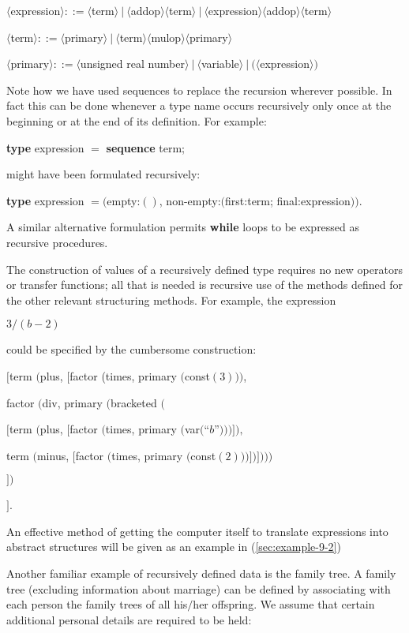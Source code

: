 \quad $\langle$expression$\rangle ::= \langle$term$\rangle\ |\ \langle$addop$\rangle \langle$term$\rangle\ |\ \langle$expression$\rangle \langle$addop$\rangle \langle$term$\rangle$

\quad $\langle$term$\rangle ::= \langle$primary$\rangle\ |\ \langle$term$\rangle\langle$mulop$\rangle\langle$primary$\rangle$

\quad $\langle$primary$\rangle ::= \langle$unsigned real number$\rangle\ |\ \langle$variable$\rangle\ |\ (\langle$expression$\rangle)$

Note how we have used sequences to replace the recursion wherever possible. In fact this can be done whenever a type name occurs recursively only once at the beginning or at the end of its definition. For example:

\quad \textbf{type} expression $=$ \textbf{sequence} term;

\noindent
might have been formulated recursively:

\quad \textbf{type} expression $= ($empty:$()$, non-empty:$($first:term; final:expression$))$.

\noindent
A similar alternative formulation permits \textbf{while} loops to be expressed as recursive procedures.

The construction of values of a recursively defined type requires no new operators or transfer functions; all that is needed is recursive use of the methods defined for the other relevant structuring methods. For example, the expression

\quad $3/(b - 2)$

\noindent
could be specified by the cumbersome construction:

\quad $[$term $($plus, $[$factor (times, primary $($const$(3)))$,

\tabto*{7.75em} factor $($div, primary $($bracketed $($

\tabto*{9em}  $[$term $($plus, $[$factor $($times, primary $($var$($``$b$''$)))]),$

\tabto*{9.1em}  term $($minus, $[$factor $($times, primary $($const$(2)))])])))$

\tabto*{7.55em}  $])$

\quad $]$.

\noindent
An effective method of getting the computer itself to translate expressions into abstract structures will be given as an example in (\ref{sec:example-9-2})

Another familiar example of recursively defined data is the family tree. A family tree (excluding information about marriage) can be defined by associating with each person the family trees of all his$/$her offspring. We assume that certain additional personal details are required to be held: 

